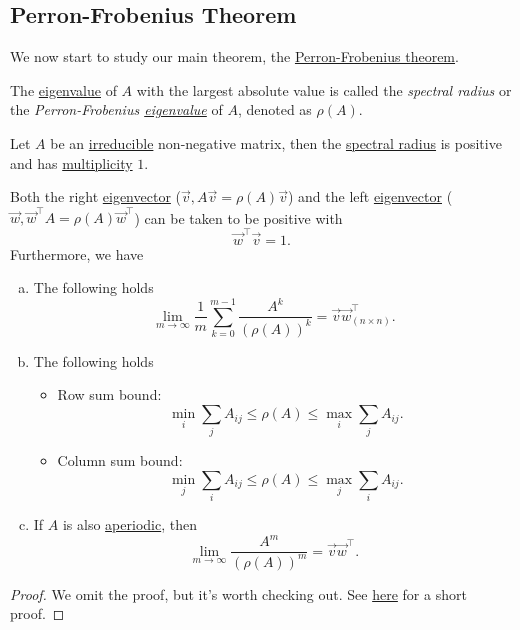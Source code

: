 \subsection{Perron-Frobenius Theorem}
We now start to study our main theorem, the \hyperref[thm:Perron-Frobenius-theorem]{Perron-Frobenius theorem}.

\begin{definition}\label{def:spectral-radius}
	The \hyperref[def:eigenvalue]{eigenvalue} of \(A\) with the largest absolute value is called the \emph{spectral radius} or the \emph{Perron-Frobenius \hyperref[def:eigenvalue]{eigenvalue}} of \(A\), denoted as \(\rho(A)\).
\end{definition}

\begin{theorem}\label{thm:Perron-Frobenius-theorem}
	Let \(A\) be an \hyperref[def:irreducible]{irreducible} non-negative matrix, then the \hyperref[def:spectral-radius]{spectral radius} is positive and has \hyperref[def:multiplicity]{multiplicity} \(1\).

	Both the right \hyperref[def:eigenvector]{eigenvector} (\(\vec{v}, A \vec{v} = \rho(A) \vec{v}\)) and the left \hyperref[def:eigenvector]{eigenvector} (\(\vec{w}, \vec{w}^{\top}A = \rho(A) \vec{w}^{\top}\))
	can be taken to be positive with
	\[
		\vec{w}^{\top} \vec{v} = 1.
	\]
	Furthermore, we have
	\begin{enumerate}[(a)]
		\item The following holds
		      \[
			      \lim_{m \to \infty} \frac{1}{m} \sum\limits_{k=0}^{m-1} \frac{A^k}{(\rho(A))^k} = \vec{v} \vec{w}^{\top}_{(n\times n)}.
		      \]
		\item The following holds
		      \begin{itemize}
			      \item Row sum bound:
			            \[
				            \min_i \sum\limits_{j} A_{ij} \leq \rho(A) \leq \max_i \sum\limits_{j} A_{ij}.
			            \]
			      \item Column sum bound:
			            \[
				            \min_j \sum\limits_{i} A_{ij} \leq \rho(A) \leq \max_j \sum\limits_{i} A_{ij}.
			            \]
		      \end{itemize}
		\item If \(A\) is also \hyperref[def:aperiodic]{aperiodic}, then
		      \[
			      \lim_{m \to \infty} \frac{A^m}{(\rho(A))^m} = \vec{v} \vec{w}^{\top}.
		      \]
	\end{enumerate}
\end{theorem}
\begin{proof}
	We omit the proof, but it's worth checking out. See \href{https://pi.math.cornell.edu/~web6720/Perron-Frobenius_Hannah%20Cairns.pdf}{here} for a short proof.
\end{proof}

